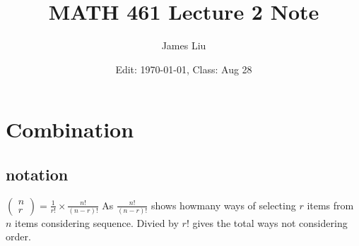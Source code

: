 \documentclass{article}
\date{Edit: \today, Class: Aug 28}
\title{MATH 461 Lecture 2 Note}
\author{James Liu}
\begin{document}
\maketitle
\section*{Combination}
\subsection*{notation}
\(\displaystyle\begin{pmatrix}
    n\\r
\end{pmatrix}=\frac{1}{r!}\times \frac{n!}{(n-r)!}\)
   As \(\displaystyle\frac{n!}{(n-r)!}\) shows howmany ways of selecting \(r\) items from \(n\) items considering sequence. Divied by \(r!\) gives the total ways not considering order.
\end{document}
